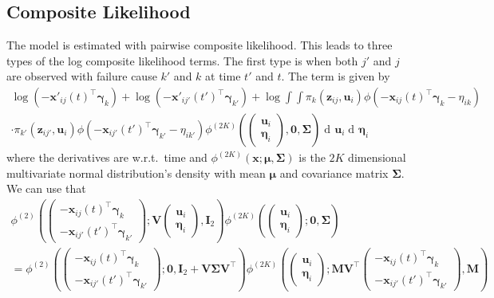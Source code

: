 \documentclass{article}
\newcommand\mat[1]{\mathbf{#1}}
\renewcommand\vec{\bm}
\newcommand\der{\operatorname{d\!}{}}
\begin{document}
\subsection*{Composite Likelihood}

The model is estimated with pairwise composite likelihood. This leads to 
three types of the log composite likelihood terms. The first type is when both 
$j'$ and $j$ are observed with failure cause $k'$ and $k$
at time $t'$ and $t$. The term is given by%
%
\begin{multline*}
\log(-\vec x'_{ij}(t)^\top\vec\gamma_k) + \log(-\vec x'_{ij'}(t')^\top\vec\gamma_{k'})
  +\log\int\int 
    \pi_k(\vec z_{ij},\vec u_i)\phi(-\vec x_{ij}(t)^\top\vec\gamma_k - \eta_{ik})  \\ 
  \cdot
    \pi_{k'}(\vec z_{ij'},\vec u_i)\phi(-\vec x_{ij'}(t')^\top\vec\gamma_{k'} - \eta_{i{k'}})
    \phi^{(2K)}\left(
      \begin{pmatrix}
        \vec u_i \\ \vec\eta_i
      \end{pmatrix}, \vec 0,\mat \Sigma\right)
    \der \vec u_i\der \vec\eta_i
\end{multline*}%
%
where the derivatives are w.r.t.\ time and 
$\phi^{(2K)}(\vec x;\vec\mu,\mat\Sigma)$ is the $2K$ dimensional 
multivariate normal distribution's density with mean $\vec\mu$ and covariance 
matrix $\mat\Sigma$. We can use that %
%
\begin{multline*}
\phi^{(2)}\left(
  \begin{pmatrix}
    -\vec x_{ij}(t)^\top\vec\gamma_k \\
    -\vec x_{ij'}(t')^\top\vec\gamma_{k'} 
  \end{pmatrix}; \mat V \begin{pmatrix}\vec u_i \\ \vec\eta_i \end{pmatrix},
  \mat I_2
  \right)
  \phi^{(2K)}\left(
    \begin{pmatrix}\vec u_i \\ \vec\eta_i \end{pmatrix}; \vec 0,\mat\Sigma
    \right) \\
  = \phi^{(2)}\left(
  \begin{pmatrix}
    -\vec x_{ij}(t)^\top\vec\gamma_k \\
    -\vec x_{ij'}(t')^\top\vec\gamma_{k'} 
  \end{pmatrix}; \vec 0 ,
  \mat I_2 + \mat V\mat\Sigma\mat V^\top
  \right)
  \phi^{(2K)}\left(
    \begin{pmatrix}\vec u_i \\ \vec\eta_i \end{pmatrix}; 
    \mat M\mat V^\top\begin{pmatrix}
      -\vec x_{ij}(t)^\top\vec\gamma_k \\
      -\vec x_{ij'}(t')^\top\vec\gamma_{k'} 
    \end{pmatrix},
    \mat M
    \right)
\end{multline*}%
\end{document}
